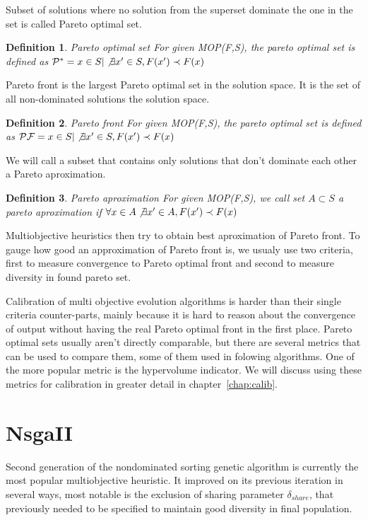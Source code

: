 \documentclass[12pt,oneside]{fithesis2}
\newtheorem{defn}{Definition}
\begin{document}
Subset of solutions where no solution from the superset dominate the one in the set is called Pareto optimal set.

\begin{defn}{Pareto optimal set}
  For given MOP(F,S), the pareto optimal set is defined as ${\cal{
P}^*} = {x \in S | \not \exists x' \in S, F(x') \prec F(x)}$
\end{defn}

Pareto front is the largest Pareto optimal set in the solution space. It is the set of all non-dominated solutions the solution space. 

\begin{defn}{Pareto front}
  For given MOP(F,S), the pareto optimal set is defined as ${\cal
{PF}} = {x \in S | \not \exists x' \in S, F(x') \prec F(x)} $
\end{defn}

We will call a subset that contains only solutions that don't dominate each other a Pareto aproximation.

\begin{defn}{Pareto aproximation}
  For given MOP(F,S), we call set $A \subset S$ a  pareto aproximation if $\forall x \in A \not \exists x' \in A, F(x') \prec F(x)$
\end{defn}

Multiobjective heuristics then try to obtain best aproximation of Pareto front. To gauge how good an approximation of Pareto front is, we usualy use two criteria, first to measure convergence to Pareto optimal front and second to measure diversity in found pareto set.

Calibration of multi objective evolution algorithms is harder than their single criteria counter-parts, mainly because it is hard to reason about the convergence of output without having the real Pareto optimal front in the first place. Pareto optimal sets usually aren't directly comparable, but there are several metrics that can be used to compare them, some of them used in folowing algorithms. One of the more popular metric is the hypervolume indicator. We will discuss using these metrics for calibration in greater detail in chapter~\ref{chap:calib}.

\section{NsgaII}
Second generation of the nondominated sorting genetic algorithm\cite{deb2002fast} is currently the most popular multiobjective heuristic. It improved on its previous iteration in several ways, most notable is the exclusion of sharing parameter $\delta_{share}$, that previously needed to be specified to maintain good diversity in final population.
\end{document}
